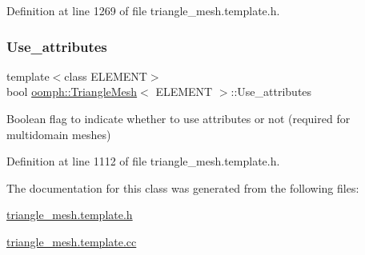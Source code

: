 Definition at line 1269 of file triangle\+\_\+mesh.\+template.\+h.

\mbox{\label{classoomph_1_1TriangleMesh_a166a8057de8390280acb6365c3df87d0}} 
\subsubsection{\texorpdfstring{Use\+\_\+attributes}{Use\_attributes}}
{\footnotesize\ttfamily template$<$class E\+L\+E\+M\+E\+NT$>$ \\
bool \hyperlink{classoomph_1_1TriangleMesh}{oomph\+::\+Triangle\+Mesh}$<$ E\+L\+E\+M\+E\+NT $>$\+::Use\+\_\+attributes}

Boolean flag to indicate whether to use attributes or not (required for multidomain meshes) 

Definition at line 1112 of file triangle\+\_\+mesh.\+template.\+h.



The documentation for this class was generated from the following files\+:\begin{DoxyCompactItemize}
\item 
\hyperlink{triangle__mesh_8template_8h}{triangle\+\_\+mesh.\+template.\+h}\item 
\hyperlink{triangle__mesh_8template_8cc}{triangle\+\_\+mesh.\+template.\+cc}\end{DoxyCompactItemize}
